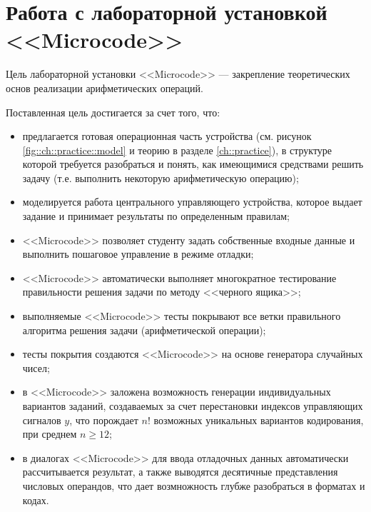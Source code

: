\section{Работа с лабораторной установкой <<Microcode>>}
\label{s::ch::practice::software}

Цель лабораторной установки <<Microcode>> --- закрепление теоретических основ реализации арифметических операций.

Поставленная цель достигается за счет того, что:
\begin{itemize}
    \item предлагается готовая операционная часть устройства (см. рисунок \ref{fig::ch::practice::model} и теорию в разделе \ref{ch::practice}), в структуре которой требуется разобраться и понять, как имеющимися средствами решить задачу (т.е. выполнить некоторую арифметическую операцию);

    \item моделируется работа центрального управляющего устройства, которое выдает задание и принимает результаты по определенным правилам;

    \item <<Microcode>> позволяет студенту задать собственные входные данные и выполнить пошаговое управление в режиме отладки;
    
    \item <<Microcode>> автоматически выполняет многократное тестирование правильности решения задачи по методу <<черного ящика>>;
    
    \item выполняемые <<Microcode>> тесты покрывают все ветки правильного алгоритма решения задачи (арифметической операции);
    
    \item тесты покрытия создаются <<Microcode>> на основе генератора случайных чисел;
    
    \item в <<Microcode>> заложена возможность генерации индивидуальных вариантов заданий, создаваемых за счет перестановки индексов управляющих сигналов $y$, что порождает $n!$ возможных уникальных вариантов кодирования, при среднем $n\ge 12$;
    
    \item в диалогах <<Microcode>> для ввода отладочных данных автоматически рассчитывается результат, а также выводятся десятичные представления числовых операндов, что дает возмножность глубже разобраться в форматах и кодах.
\end{itemize}


